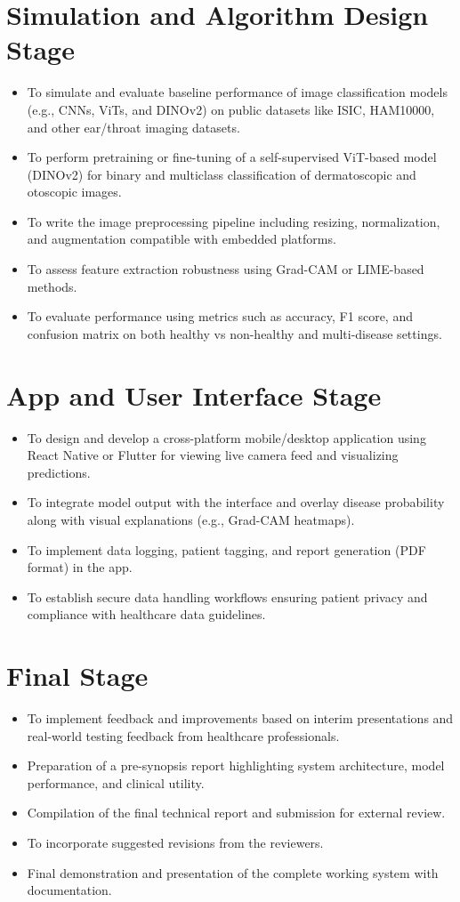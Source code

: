 \section{Simulation and Algorithm Design Stage}
\begin{itemize}
\item To simulate and evaluate baseline performance of image classification models (e.g., CNNs, ViTs, and DINOv2) on public datasets like ISIC, HAM10000, and other ear/throat imaging datasets.
\item To perform pretraining or fine-tuning of a self-supervised ViT-based model (DINOv2) for binary and multiclass classification of dermatoscopic and otoscopic images.
\item To write the image preprocessing pipeline including resizing, normalization, and augmentation compatible with embedded platforms.
\item To assess feature extraction robustness using Grad-CAM or LIME-based methods.
\item To evaluate performance using metrics such as accuracy, F1 score, and confusion matrix on both healthy vs non-healthy and multi-disease settings.
\end{itemize}

\section{App and User Interface Stage}
\begin{itemize}
\item To design and develop a cross-platform mobile/desktop application using React Native or Flutter for viewing live camera feed and visualizing predictions.
\item To integrate model output with the interface and overlay disease probability along with visual explanations (e.g., Grad-CAM heatmaps).
\item To implement data logging, patient tagging, and report generation (PDF format) in the app.
\item To establish secure data handling workflows ensuring patient privacy and compliance with healthcare data guidelines.
\end{itemize}

\section{Final Stage}
\begin{itemize}
\item To implement feedback and improvements based on interim presentations and real-world testing feedback from healthcare professionals.
\item Preparation of a pre-synopsis report highlighting system architecture, model performance, and clinical utility.
\item Compilation of the final technical report and submission for external review.
\item To incorporate suggested revisions from the reviewers.
\item Final demonstration and presentation of the complete working system with documentation.
\end{itemize}
